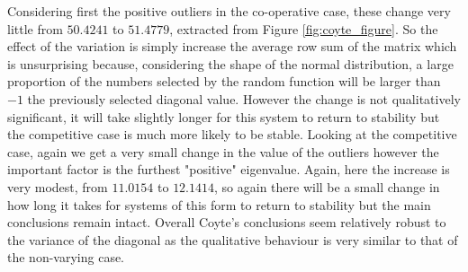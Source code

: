\documentclass[11pt]{scrreprt}
\begin{document}
\begin{enumerate}
		Considering first the positive outliers in the co-operative case, these change very little from $50.4241$ to $51.4779$, extracted from Figure \ref{fig:coyte_figure}. So the effect of the variation is simply increase the average row sum of the matrix which is unsurprising because, considering the shape of the normal distribution, a large proportion of the numbers selected by the random function will be larger than $-1$ the previously selected diagonal value. However the change is not qualitatively significant, it will take slightly longer for this system to return to stability but the competitive case is much more likely to be stable. Looking at the competitive case, again we get a very small change in the value of the outliers however the important factor is the furthest "positive" eigenvalue. Again, here the increase is very modest, from $11.0154$ to $12.1414$, so again there will be a small change in how long it takes for systems of this form to return to stability but the main conclusions remain intact. Overall Coyte's conclusions seem relatively robust to the variance of the diagonal as the qualitative behaviour is very similar to that of the non-varying case. 
	\end{enumerate}
	
\end{document}
